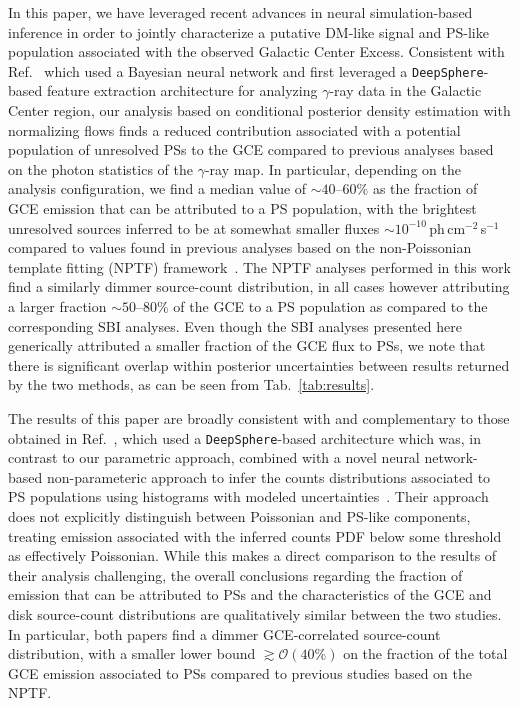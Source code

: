 \documentclass[prd,aps,10pt,nofootinbib,twocolumn,superscriptaddress,preprintnumbers,balancelastpage,longbibliography,floatfix]{revtex4-2}
\begin{document}
In this paper, we have leveraged recent advances in neural simulation-based inference in order to jointly characterize a putative DM-like signal and PS-like population associated with the observed \Fermi Galactic Center Excess. Consistent with Ref.~\cite{List:2020mzd} which used a Bayesian neural network and first leveraged a \texttt{DeepSphere}-based feature extraction architecture for analyzing $\gamma$-ray data in the Galactic Center region, our analysis based on conditional posterior density estimation with normalizing flows finds a reduced contribution associated with a potential population of unresolved PSs to the GCE compared to previous analyses based on the photon statistics of the $\gamma$-ray map. In particular, depending on the analysis configuration, we find a median value of $\sim40$--$60\%$ as the fraction of GCE emission that can be attributed to a PS population, with the brightest unresolved sources inferred to be at somewhat smaller fluxes $\sim 10^{-10}$\,ph\,cm$^{-2}$\,s$^{-1}$ compared to values found in previous analyses based on the non-Poissonian template fitting (NPTF) framework~\cite{Lee:2015fea}. The NPTF analyses performed in this work find a similarly dimmer source-count distribution, in all cases however attributing a larger fraction $\sim50$--$80\%$ of the GCE to a PS population as compared to the corresponding SBI analyses. Even though the SBI analyses presented here generically attributed a smaller fraction of the GCE flux to PSs, we note that there is significant overlap within posterior uncertainties between results returned by the two methods, as can be seen from Tab.~\ref{tab:results}.

The results of this paper are broadly consistent with and complementary to those obtained in Ref.~\cite{List:2021aer}, which used a \texttt{DeepSphere}-based architecture which was, in contrast to our parametric approach, combined with a novel neural network-based non-parameteric approach to infer the counts distributions associated to PS populations using histograms with modeled uncertainties~\cite{List2021}. Their approach does not explicitly distinguish between Poissonian and PS-like components, treating emission associated with the inferred counts PDF below some threshold as effectively Poissonian. While this makes a direct comparison to the results of their analysis challenging, the overall conclusions regarding the fraction of emission that can be attributed to PSs and the characteristics of the GCE and disk source-count distributions are qualitatively similar between the two studies. In particular, both papers find a dimmer GCE-correlated source-count distribution, with a smaller lower bound $\gtrsim \mathcal O(40\%)$ on the fraction of the total GCE emission associated to PSs compared to previous studies based on the NPTF.
\end{document}
